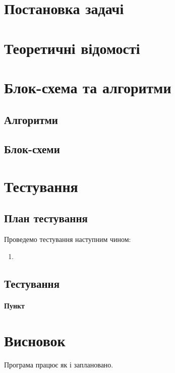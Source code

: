 \nocite{*}
\sffamily

\section{Постановка задачі}


\section{Теоретичні відомості}



\section{Блок-схема та алгоритми}
\subsection{Алгоритми}


\subsection{Блок-схеми}


\section{Тестування}
\subsection{План тестування}
Проведемо тестування наступним чином:
\begin{enumerate}
	\item
\end{enumerate}
\subsection{Тестування}
\paragraph{Пункт }


\section{Висновок}
Програма працює як і заплановано.